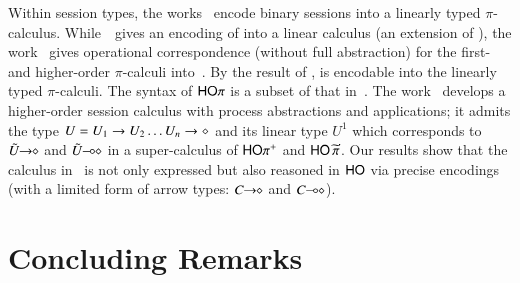 \documentclass[preprint,11pt]{elsarticle}
\begin{document}
{Within session types, the works~\cite{DemangeonH11,Dardha:2012:STR:2370776.2370794} 
encode binary sessions into a linearly typed $\pi$-calculus. 
While~\cite{DemangeonH11}~gives an encoding of \sessp into a linear calculus 
(an extension of \cite{BHY}),  
the work~\cite{Dardha:2012:STR:2370776.2370794} 
gives  operational correspondence (without full abstraction)
for the first- and higher-order 
$\pi$-calculi into~\cite{LinearPi}. 
By the result of \cite{DemangeonH11}, 
\HOpp is encodable  into the linearly typed $\pi$-calculi.     
The syntax of $\mathsf{HO}\pi$ is a subset of that in~\cite{tlca07,MostrousY15}.
The work~\cite{tlca07} develops a higher-order session calculus
with process abstractions and applications; it admits the type 
$U=U_1 \rightarrow U_2 \dots U_n \rightarrow \diamond$ and its linear type 
$U^1$
which corresponds to $\tilde{U}\!\! \rightarrow\!\! \diamond$ and $\tilde{U}\!\! \multimap\!\! \diamond$ in 
a super-calculus of $\mathsf{HO\pi^{+}}$ and $\mathsf{HO}\,{\widetilde{\pi}}$. 
Our results show that
the calculus in~\cite{tlca07} is not only expressed but 
also reasoned in 
$\mathsf{HO}$ via precise encodings (with a limited form of arrow types: $C\!\! \rightarrow\!\! \diamond$ and $C\!\! \multimap\!\! \diamond$). 

\section{Concluding Remarks}
\label{sec:concl}
%

}
\end{document}
